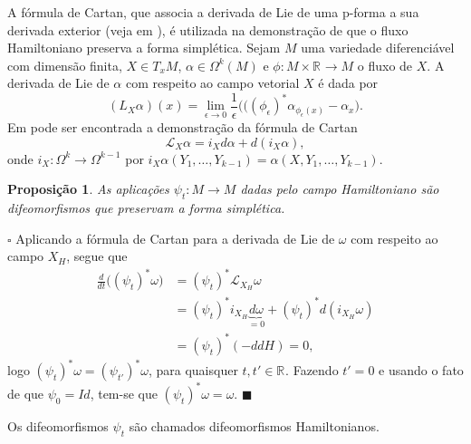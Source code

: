 \documentclass[12pt]{book}
\newtheorem{proposicao}[teorema]{Proposição}
\newenvironment{prova}[1]{$\square$ #1}{\hfill$\blacksquare$}
\newcommand{\bigparenteses}[1]{\Big( #1 \Big) }
\newcommand{\campohamiltonianoabrev}{X_{H}}
\newcommand{\liederivada}[1]{\mathcal{L}_{#1}}
\newcommand{\real}[1]{\mathbb{R}^{#1}}
\newcommand{\reta}{\real{}}
\begin{document}
	A fórmula de Cartan, que associa a derivada de Lie de uma p-forma a sua derivada exterior (veja em \cite{nakahara}), é utilizada na demonstração de que o fluxo Hamiltoniano preserva a forma simplética. Sejam $M$ uma variedade diferenciável com dimensão finita, $X \in T_{x}M$, $\alpha \in \Omega^{k}(M)$ e $\phi:M\times \reta \to M$ o fluxo de $X$. A derivada de Lie de $\alpha$ com respeito ao campo vetorial $X$ é dada por
	$$
	(L_{X}\alpha)(x)=\lim\limits_{\epsilon\to 0} \frac{1}{\epsilon}\big( ((\phi_{\epsilon})^{*}\alpha_{\phi_{\epsilon}(x)} - \alpha_{x} \big).
	$$
	Em \cite{nakahara} pode ser encontrada a demonstração da fórmula de Cartan	
	$$
	\liederivada{X}\alpha = i_{X}d\alpha + d(i_{X}\alpha),
	$$
	onde $i_{X}:\Omega^{k} \to \Omega^{k-1}$ por $i_{X}\alpha(Y_{1}, \dots, Y_{k-1}) = \alpha(X, Y_{1}, \dots, Y_{k-1})$.	
	
	\begin{proposicao}\label{proposicao_familia_simplectomorfismos}
		As aplicações $\psi_{t}:M\to M$ dadas pelo campo Hamiltoniano são difeomorfismos que preservam a forma simplética.
	\end{proposicao}
	\begin{prova}
		Aplicando a fórmula de Cartan para a derivada de Lie de $\omega$ com respeito ao campo $\campohamiltonianoabrev$, segue que		
		$$
		\begin{aligned}
		\frac{d}{dt}\bigparenteses{(\psi_{t})^{*}\omega} 
		&= (\psi_{t})^{*} \liederivada{X_{H}}\omega  
		\\
		&= (\psi_{t})^{*} i_{X_{H}}\underbrace{d\omega }_ {=0}+  (\psi_{t})^{*}d(i_{X_{H}}\omega) 
		\\
		&= (\psi_{t})^{*} (-ddH)=0,
		\end{aligned}
		$$
		logo $(\psi_{t})^{*} \omega = (\psi_{t'})^{*} \omega$, para quaisquer $t, t' \in \real{}$. Fazendo $t'=0$ e usando o fato de que $\psi_{0} = Id$, tem-se que  $(\psi_{t})^{*} \omega = \omega$.
	\end{prova}
	
	Os difeomorfismos $\psi_{t}$ são  chamados difeomorfismos Hamiltonianos.
	
\end{document}
